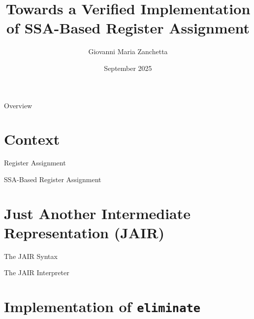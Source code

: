 \documentclass[aspectratio=169,xcolor=dvipsnames]{beamer}
\title{Towards a Verified Implementation of SSA-Based Register Assignment}
\author{Giovanni Maria Zanchetta}
\institute
{
    Supervisor: Prof. Marco Patrignani \\
    Co-Supervisor: Matthis Kruse \\
}
\date{September 2025}
\begin{document}
\begin{frame}
    \titlepage
\end{frame}

\begin{frame}{Overview}
    \tableofcontents
\end{frame}

\section{Context}
% 

\begin{frame}{Register Assignment}

\end{frame}

\begin{frame}{SSA-Based Register Assignment}

\end{frame}

% 

\section{Just Another Intermediate Representation (JAIR)}

\begin{frame}{The JAIR Syntax}

\end{frame}

\begin{frame}{The JAIR Interpreter}

\end{frame}

\section{Implementation of \texttt{eliminate}}
\end{document}

